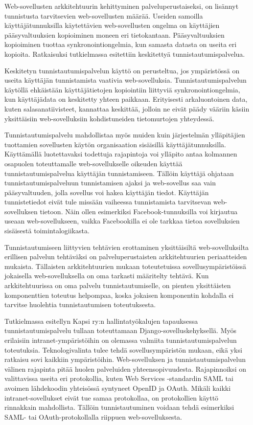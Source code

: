 Web-sovellusten arkkitehtuurin kehittyminen palveluperustaiseksi, on lisännyt tunnistusta tarvitsevien web-sovellusten määrää. Useiden samoilla käyttäjätunnuksilla käytettävien web-sovellusten ongelma on käyttäjien pääsyvaltuuksien kopioiminen moneen eri tietokantaan. Pääsyvaltuuksien kopioiminen tuottaa synkronointiongelmia, kun samasta datasta on useita eri kopioita. Ratkaisuksi tutkielmassa esitettiin keskitettyä tunnistautumispalvelua.

Keskitetyn tunnistautumispalvelun käyttö on perusteltua, jos ympäristössä on useita käyttäjän tunnistamista vaativia web-sovelluksia. Tunnistautumispalvelun käytöllä ehkäistään käyttäjätietojen kopiointiin liittyviä synkronointiongelmia, kun käyttäjädata on keskitetty yhteen paikkaan. Erityisesti arkaluontoinen data, kuten salasanatiivisteet, kannattaa keskittää, jolloin ne eivät päädy vääriin käsiin yksittäisiin web-sovelluksiin kohdistuneiden tietomurtojen yhteydessä.

Tunnistautumispalvelu mahdollistaa myös muiden kuin järjestelmän ylläpitäjien tuottamien sovellusten käytön organisaation sisäisillä käyttäjätunnuksilla. Käyttämällä luotettavaksi todettuja rajapintoja voi ylläpito antaa kolmannen osapuolen toteuttamalle web-sovellukselle oikeuden käyttää tunnistautumispalvelua käyttäjän tunnistamiseen. Tällöin käyttäjä ohjataan tunnistautumispalveluun tunnistamisen ajaksi ja web-sovellus saa vain pääsyvaltuuden, jolla sovellus voi hakea käyttäjän tiedot. Käyttäjän tunnistetiedot eivät tule missään vaiheessa tunnistamista tarvitsevan web-sovelluksen tietoon. Näin ollen esimerkiksi Facebook-tunnuksilla voi kirjautua useaan web-sovellukseen, vaikka Facebookilla ei ole tarkkaa tietoa sovelluksien sisäisestä toimintalogiikasta.

Tunnistautumiseen liittyvien tehtävien erottaminen yksittäisiltä web-sovelluksilta erillisen palvelun tehtäväksi on palveluperustaisten arkkitehtuurien periaatteiden mukaista. Tällaisten arkkitehtuurien mukaan toteutetuissa sovellusympäristöissä jokaisella web-sovelluksella on oma tarkasti määritelty tehtävä. Kun arkkitehtuurissa on oma palvelu tunnistautumiselle, on pienten yksittäisten komponenttien toteutus helpompaa, koska jokaisen komponentin kohdalla ei tarvitse huolehtia tunnistautumisen toteutuksesta.

Tutkielmassa esitellyn Kapsi ry:n hallintatyökalujen tapauksessa tunnistautumispalvelu tullaan toteuttamaan Django-sovelluskehyksellä. Myös erilaisiin intranet-ympäristöihin on olemassa valmiita tunnistautumispalvelun toteutuksia. Teknologivalinta tulee tehdä sovellusympäristön mukaan, eikä yksi ratkaisu sovi kaikkiin ympäristöihin. Web-sovelluksen ja tunnistautumispalvelun välinen rajapinta pitää huolen palveluiden yhteensopivuudesta. Rajapinnoiksi on valittavissa useita eri protokollia, kuten Web Services -standardin SAML tai avoimen lähdekoodin yhteisössä syntyneet OpenID ja OAuth. Mikäli kaikki intranet-sovellukset eivät tue samaa protokollaa, on protokollien käyttö rinnakkain mahdollista. Tällöin tunnistautuminen voidaan tehdä esimerkiksi SAML- tai OAuth-protokollalla riippuen web-sovelluksesta.

